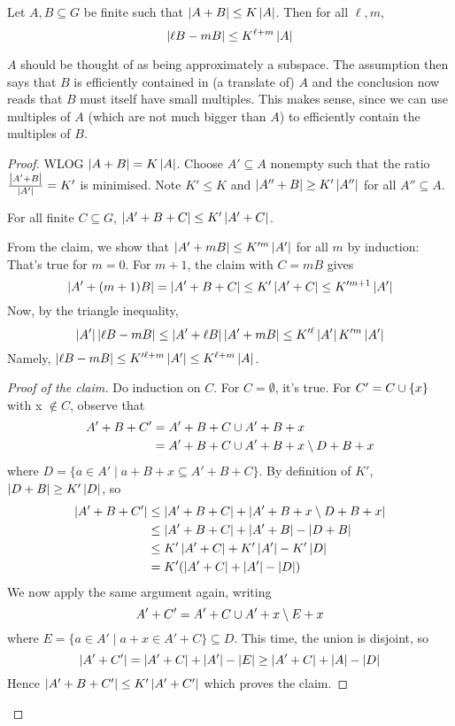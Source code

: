 \documentclass{article}
\begin{document}
\begin{nthm}
  Let $A, B \subseteq G$ be finite such that $\left\lvert A + B\right\rvert \le K\left\lvert A\right\rvert$. Then for all $\ell, m$,
  $$\left\lvert \ell B - mB\right\rvert \le K^{\ell + m}\left\lvert A\right\rvert$$
\end{nthm}
\begin{idea}
  $A$ should be thought of as being approximately a subspace. The assumption then says that $B$ is efficiently contained in (a translate of) $A$ and the conclusion now reads that $B$ must itself have small multiples. This makes sense, since we can use multiples of $A$ (which are not much bigger than $A$) to efficiently contain the multiples of $B$.
\end{idea}
\begin{proof}
  WLOG $\left\lvert A + B\right\rvert = K\left\lvert A\right\rvert$. Choose $A' \subseteq A$ nonempty such that the ratio $\frac{\left\lvert A' + B\right\rvert}{\left\lvert A'\right\rvert} = K'$ is minimised. Note $K' \le K$ and $\left\lvert A'' + B\right\rvert \ge K'\left\lvert A''\right\rvert$ for all $A'' \subseteq A$.
  \begin{claim}
    For all finite $C \subseteq G$, $\left\lvert A' + B + C\right\rvert \le K'\left\lvert A' + C\right\rvert$.
  \end{claim}
  From the claim, we show that $\left\lvert A' + mB\right\rvert \le K'^m\left\lvert A'\right\rvert$ for all $m$ by induction:
  That's true for $m = 0$. For $m + 1$, the claim with $C = mB$ gives
  $$\left\lvert A' + (m + 1)B\right\rvert = \left\lvert A' + B + C\right\rvert \le K'\left\lvert A' + C\right\rvert \le K'^{m + 1}\left\lvert A'\right\rvert$$
  Now, by the triangle inequality,
  $$\left\lvert A'\right\rvert\left\lvert \ell B - mB\right\rvert \le \left\lvert A' + \ell B\right\rvert\left\lvert A' + mB\right\rvert \le K'^\ell \left\lvert A'\right\rvert K'^m \left\lvert A'\right\rvert$$
  Namely, $\left\lvert \ell B - mB\right\rvert \le K'^{\ell + m}\left\lvert A'\right\rvert \le K^{\ell + m} \left\lvert A\right\rvert$.
  \begin{proof}[Proof of the claim]
    Do induction on $C$. For $C = \emptyset$, it's true. For $C' = C \cup \{x\}$ with x $\notin C$, observe that
    \begin{align*}
      A' + B + C'
      & = A' + B + C \cup A' + B + x \\
      & = A' + B + C \cup A' + B + x \setminus D + B + x
    \end{align*}
    where $D = \{a \in A' \mid a + B + x \subseteq A' + B + C\}$. By definition of $K'$, $\left\lvert D + B\right\rvert \ge K'\left\lvert D\right\rvert$, so
    \begin{align*}
      \left\lvert A' + B + C'\right\rvert
      & \le \left\lvert A' + B + C\right\rvert + \left\lvert A' + B + x \setminus D + B + x\right\rvert \\
      & \le \left\lvert A' + B + C\right\rvert + \left\lvert A' + B\right\rvert - \left\lvert D + B\right\rvert \\
      & \le K'\left\lvert A' + C\right\rvert + K'\left\lvert A'\right\rvert - K'\left\lvert D\right\rvert \\
      & = K'(\left\lvert A' + C\right\rvert + \left\lvert A'\right\rvert - \left\lvert D\right\rvert)
    \end{align*}
    We now apply the same argument again, writing
    $$A' + C' = A' + C \cup A' + x \setminus E + x$$
    where $E = \{a \in A' \mid a + x \in A' + C\} \subseteq D$. This time, the union is disjoint, so
    $$\left\lvert A '+ C'\right\rvert = \left\lvert A' + C\right\rvert + \left\lvert A'\right\rvert - \left\lvert E\right\rvert \ge \left\lvert A' + C\right\rvert + \left\lvert A\right\rvert - \left\lvert D\right\rvert$$
    Hence $\left\lvert A' + B + C'\right\rvert \le K'\left\lvert A' + C'\right\rvert$ which proves the claim.
  \end{proof}
\end{proof}
\end{document}
